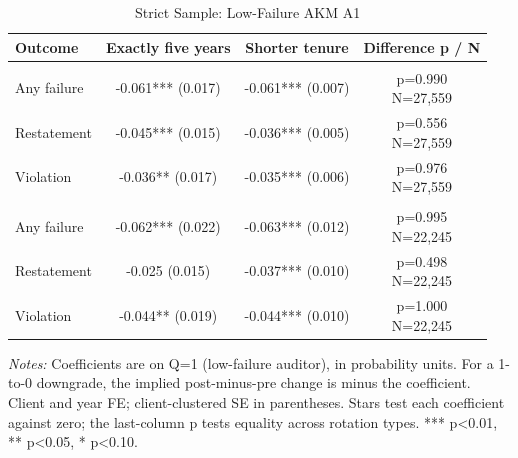\begin{table}[htbp]
\footnotesize
\centering
\caption{Strict Sample: Low-Failure AKM A1}
\begin{threeparttable}
\begin{tabular}{p{}ccc}
\toprule
Outcome & Exactly five years & Shorter tenure & Difference p / N \\
\midrule
\addlinespace
\multicolumn{4}{l}{\textbf{Panel A: Upgrade}} \\
Any failure & -0.061*** (0.017) & -0.061*** (0.007) & \shortstack{p=0.990\\N=27,559} \\
Restatement & -0.045*** (0.015) & -0.036*** (0.005) & \shortstack{p=0.556\\N=27,559} \\
Violation & -0.036** (0.017) & -0.035*** (0.006) & \shortstack{p=0.976\\N=27,559} \\
\addlinespace
\multicolumn{4}{l}{\textbf{Panel B: Downgrade}} \\
Any failure & -0.062*** (0.022) & -0.063*** (0.012) & \shortstack{p=0.995\\N=22,245} \\
Restatement & -0.025 (0.015) & -0.037*** (0.010) & \shortstack{p=0.498\\N=22,245} \\
Violation & -0.044** (0.019) & -0.044*** (0.010) & \shortstack{p=1.000\\N=22,245} \\
\bottomrule
\end{tabular}
\begin{tablenotes}\footnotesize
\item \raggedright \textit{Notes:} Coefficients are on Q=1 (low-failure auditor), in probability units. For a 1-to-0 downgrade, the implied post-minus-pre change is minus the coefficient. Client and year FE; client-clustered SE in parentheses. Stars test each coefficient against zero; the last-column p tests equality across rotation types. *** p<0.01, ** p<0.05, * p<0.10.
\end{tablenotes}
\end{threeparttable}
\end{table}
